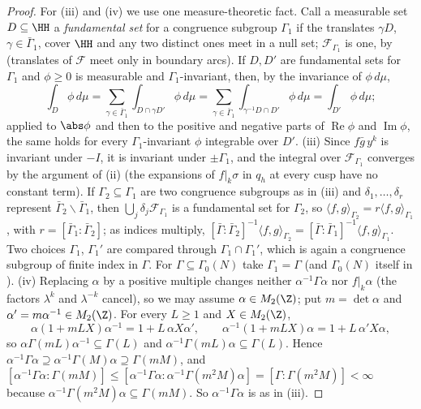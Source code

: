 \begin{proof}
For (iii) and (iv) we use one measure-theoretic fact. Call a measurable set $D\subseteq\HH$ a \emph{fundamental set} for a congruence subgroup $\Gamma_1$ if the translates $\gamma D$,
$\gamma\in\bar\Gamma_1$, cover $\HH$ and any two distinct ones meet in a null set; $\mathcal F_{\Gamma_1}$ is one, by  (translates of $\mathcal F$ meet only in
boundary arcs). If $D,D'$ are fundamental sets for $\Gamma_1$ and $\phi\ge0$ is measurable and $\Gamma_1$-invariant, then, by the invariance of $\phi\,d\mu$,
\[
\int_D\phi\,d\mu=\sum_{\gamma\in\bar\Gamma_1}\int_{D\cap\gamma D'}\phi\,d\mu=\sum_{\gamma\in\bar\Gamma_1}\int_{\gamma^{-1}D\cap D'}\phi\,d\mu=\int_{D'}\phi\,d\mu ;
\]
applied to $\abs\phi$ and then to the positive and negative parts of $\operatorname{Re}\phi$ and $\operatorname{Im}\phi$, the same holds for every $\Gamma_1$-invariant $\phi$ integrable over $D'$.
(iii) Since $f\bar g\,y^k$ is invariant under $-I$, it is invariant under $\pm\Gamma_1$, and the integral over $\mathcal F_{\Gamma_1}$ converges by the argument of (ii) (the
expansions of $f|_k\sigma$ in $q_h$ at every cusp have no constant term). If $\Gamma_2\subseteq\Gamma_1$ are two congruence subgroups as in (iii) and $\delta_1,\dots,\delta_r$ represent
$\bar\Gamma_2\backslash\bar\Gamma_1$, then $\bigcup_j\delta_j\mathcal F_{\Gamma_1}$ is a fundamental set for $\Gamma_2$, so $\langle f,g\rangle_{\Gamma_2}=r\langle f,g\rangle_{\Gamma_1}$, with
$r=[\bar\Gamma_1:\bar\Gamma_2]$; as indices multiply, $[\bar\Gamma:\bar\Gamma_2]^{-1}\langle f,g\rangle_{\Gamma_2}=[\bar\Gamma:\bar\Gamma_1]^{-1}\langle f,g\rangle_{\Gamma_1}$. Two choices $\Gamma_1$, $\Gamma_1'$ are compared through
$\Gamma_1\cap\Gamma_1'$, which is again a congruence subgroup of finite index in $\Gamma$. For $\Gamma\subseteq\Gamma_0(N)$ take $\Gamma_1=\Gamma$ (and $\Gamma_0(N)$ itself in ).
(iv) Replacing $\alpha$ by a positive multiple changes neither $\alpha^{-1}\Gamma\alpha$ nor $f|_k\alpha$ (the factors $\lambda^k$ and $\lambda^{-k}$ cancel), so we may assume $\alpha\in M_2(\Z)$; put
$m=\det\alpha$ and $\alpha'=m\alpha^{-1}\in M_2(\Z)$. For every $L\ge1$ and $X\in M_2(\Z)$,
\[
\alpha(1+mLX)\alpha^{-1}=1+L\,\alpha X\alpha',\qquad\alpha^{-1}(1+mLX)\alpha=1+L\,\alpha'X\alpha,
\]
so $\alpha\Gamma(mL)\alpha^{-1}\subseteq\Gamma(L)$ and $\alpha^{-1}\Gamma(mL)\alpha\subseteq\Gamma(L)$. Hence $\alpha^{-1}\Gamma\alpha\supseteq\alpha^{-1}\Gamma(M)\alpha\supseteq\Gamma(mM)$, and
$[\alpha^{-1}\Gamma\alpha:\Gamma(mM)]\le[\alpha^{-1}\Gamma\alpha:\alpha^{-1}\Gamma(m^2M)\alpha]=[\Gamma:\Gamma(m^2M)]<\infty$ because $\alpha^{-1}\Gamma(m^2M)\alpha\subseteq\Gamma(mM)$. So $\alpha^{-1}\Gamma\alpha$ is as in (iii).

\end{proof}
